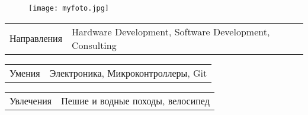 \documentclass[10pt,A4]{article}
\newcommand{\tzlarrow}{(0,0) -- (0.2,0) -- (0.3,0.2) -- (0.2,0.4) -- (0,0.4) -- (0.1,0.2) -- cycle;}
\newcommand{\larrow}[1]
{\begin{tikzpicture}[scale=0.58]
	 \filldraw[fill=#1!100,draw=#1!100!black]  \tzlarrow
 \end{tikzpicture}
}
\newcommand{\metasection}[2]
{
\begin{tabular*}{1\textwidth}{p{2.6cm} p{11cm}}
\larrow{bgcol}	\normalsize{\textcolor{sectcol}{#1}}&#2\\[12pt]
\end{tabular*}
}
\begin{document}
\pagestyle{fancy}	


\vspace{-20.55pt}


\hspace{-0.25\linewidth}\colorbox{bgcol}{}



\begin{figure}[H]
\begin{flushright}
	\texttt{[image: myfoto.jpg]}	%
\end{flushright}
\end{figure}



\vspace{-114pt}

\metasection{Направления}{Hardware Development, Software Development, Consulting} 
\metasection{Умения}{Электроника, Микроконтроллеры, Git}
\metasection{Увлечения}{Пешие и водные походы, велосипед}
\end{document}
